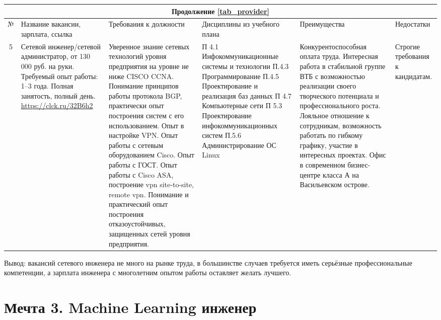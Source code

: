 \documentclass[14pt]{extreport}
\begin{document}
\begin{landscape}
\begin{table}[H]
	\begin{tabular}{|c|p{3.3cm}|p{6cm}|p{4.7cm}|p{5.5cm}|p{3.5cm}|}
	\multicolumn{6}{c}{Продолжение \ref{tab_provider}} \\
	\hline № & {Название вакансии, зарплата, ссылка} & {Требования к должности} & {Дисциплины из учебного плана} & {Преимущества} & {Недостатки} \\
 	\hline 5 & {Сетевой инженер/сетевой администратор,
от 130 000 руб. на руки.
Требуемый опыт работы: 1–3 года.
Полная занятость, полный день. \url{https://clck.ru/32B6h2}} & {Уверенное знание сетевых технологий уровня предприятия на уровне не ниже CISCO CCNA. Понимание принципов работы протокола BGP, практически опыт построения систем с его использованием. Опыт в настройке VPN. Опыт работы с сетевым оборудованием Cisco.
Опыт работы с ГОСТ. Опыт работы с Cisco ASA, построение vpn site-to-site, remote vpn. Понимание и практический опыт построения отказоустойчивых, защищенных сетей уровня предприятия.} & {П 4.1 Инфокоммуникационные системы и технологии
П.4.3 Программирование
П.4.5 Проектирование и реализация баз данных
П 4.7 Компьютерные сети
П 5.3 Проектирование инфокоммуникационных систем
П.5.6 Администрирование ОС Linux} & {Конкурентоспособная оплата труда. Интересная работа в стабильной группе ВТБ с возможностью реализации своего творческого потенциала и профессионального роста.  Лояльное отношение к сотрудникам, возможность работать по гибкому графику, участие в интересных проектах. Офис в современном бизнес-центре класса А на Васильевском острове.} & {Строгие требования к кандидатам.} \\
	\hline
	\end{tabular}
\end{table}

Вывод: вакансий сетевого инженера не много на рынке труда, в большинстве случаев требуется иметь серьёзные профессиональные компетенции, а зарплата инженера с многолетним опытом работы оставляет желать лучшего.

\section{Мечта 3. Machine Learning инженер}


\end{landscape}
\end{document}
